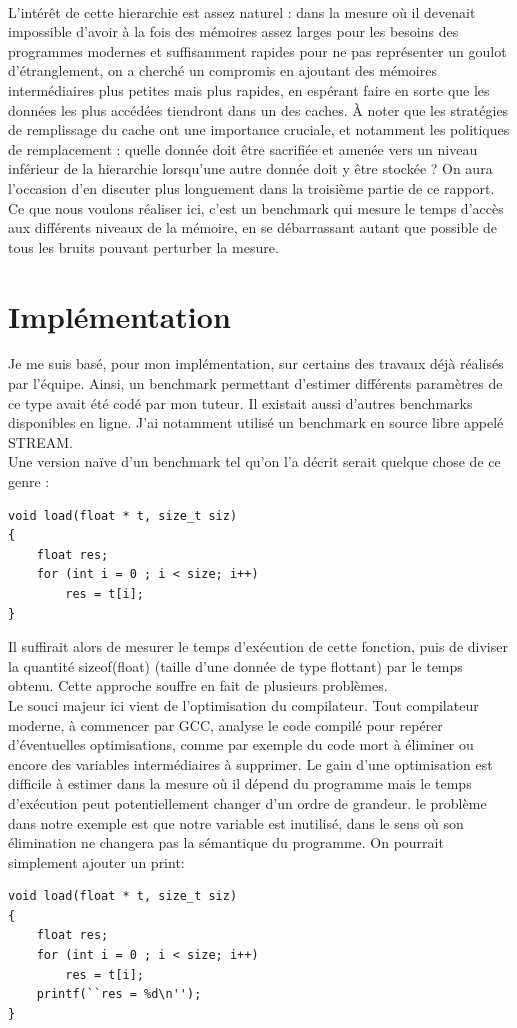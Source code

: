 \documentclass{report}
\begin{document}
\\L'intérêt de cette hierarchie est assez naturel : dans la mesure où il devenait impossible d'avoir
à la fois des mémoires assez larges pour les besoins des programmes modernes et suffisamment
rapides pour ne pas représenter un goulot d'étranglement, on a cherché un compromis en ajoutant
des mémoires intermédiaires plus petites mais plus rapides, en espérant faire en sorte que les données
les plus accédées tiendront dans un des caches. À noter que les stratégies de remplissage du cache ont
une importance cruciale, et notamment les politiques de remplacement : quelle donnée doit être 
sacrifiée et amenée vers un niveau inférieur de la hierarchie lorsqu'une autre donnée doit y être
stockée ? On aura l'occasion d'en discuter plus longuement dans la troisième partie de ce rapport.
\\Ce que nous voulons réaliser ici, c'est un benchmark qui mesure le temps d'accès aux différents 
niveaux de la mémoire, en se débarrassant autant que possible de tous les bruits pouvant perturber
la mesure.

\section{Implémentation}

Je me suis basé, pour mon implémentation, sur certains des travaux déjà réalisés par l'équipe.
Ainsi, un benchmark permettant d'estimer différents paramètres de ce type avait été codé par
mon tuteur. Il existait aussi d'autres benchmarks disponibles en ligne. J'ai notamment utilisé
un benchmark en source libre appelé STREAM.
\\Une version naïve d'un benchmark tel qu'on l'a décrit serait quelque chose de ce genre :

\begin{lstlisting}
void load(float * t, size_t siz)
{
    float res;
    for (int i = 0 ; i < size; i++)
        res = t[i]; 
}
\end{lstlisting}

Il suffirait alors de mesurer le temps d'exécution de cette fonction, puis de diviser la quantité
sizeof(float) (taille d'une donnée de type flottant) par le temps obtenu. Cette approche souffre
en fait de plusieurs problèmes.
\\Le souci majeur ici vient de l'optimisation du compilateur. Tout compilateur moderne, à commencer
par GCC, analyse le code compilé pour repérer d'éventuelles optimisations, comme par exemple du 
code mort à éliminer ou encore des variables intermédiaires à supprimer. Le gain d'une optimisation
est difficile à estimer dans la mesure où il dépend du programme mais le temps d'exécution peut
potentiellement changer d'un ordre de grandeur. le problème dans notre exemple est que notre variable
est inutilisé, dans le sens où son élimination ne changera pas la sémantique du programme. On pourrait
simplement ajouter un print:
\begin{lstlisting}
void load(float * t, size_t siz)
{
    float res;
    for (int i = 0 ; i < size; i++)
        res = t[i]; 
    printf(``res = %d\n''); 
}
\end{lstlisting}
\end{document}
